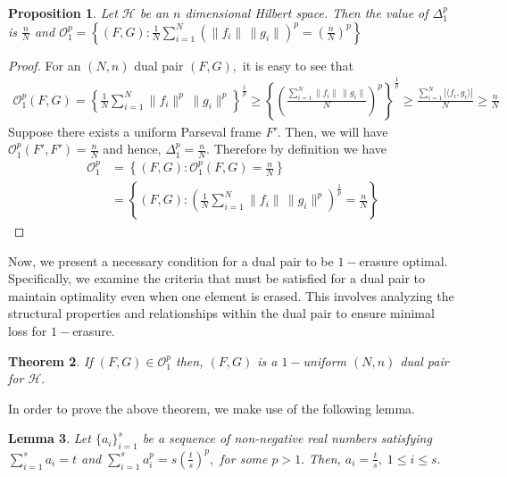 \documentclass[final,1p,times]{elsarticle}
\newtheorem{thm}{Theorem}[section]
\newtheorem{lem}[thm]{Lemma}
\newtheorem{prop}[thm]{Proposition}
\begin{document}
	\begin{prop}\label{prop4point1}
	Let $\mathcal{H}$ be an $n$ dimensional Hilbert space. Then the  value of $ \Delta_{1}^p$ is $\frac{n}{N}$ and  $ \mathcal{O}_{1}^p = \left\{(F,G): \frac{1}{N} \sum\limits_{i=1}^N \left(\|f_i\|\,\| g_i \| \right)^p =  \left(  \frac{n}{N}  \right)^p \right\}$ 
\end{prop}
\begin{proof}
	For an $(N,n) $ dual pair $(F,G),$ it is easy to see that
	\begin{align*}
		\mathcal{O}_{1}^p (F,G) = \left\{\frac{1}{N} \sum \limits_{i=1}^N\|f_i\|^p\,\| g_i \| ^p\right\}^{\frac{1}{p}} \geq \left\{ \left(\frac{\sum\limits_{i=1}^N \|f_i\|\,\| g_i \|}{N}  \right)^p\right\}^{\frac{1}{p}} \geq \frac{\sum\limits_{i=1}^N \left|\langle f_i, g_i \rangle \right|}{N} \geq \frac{n}{N}
	\end{align*}
Suppose there exists a uniform Parseval frame $F'$. Then, we will have  $\mathcal{O}_{1}^p (F',F') = \frac{n}{N} $ and hence, $ \Delta_{1}^p  = \frac{n}{N}.$ Therefore by definition we have 
\begin{align*}
	\mathcal{O}_{1}^p  &= \left\{(F,G): \mathcal{O}_{1}^p (F,G) = \frac{n}{N} \right\} \\& = \left\{(F,G): \left(\frac{1}{N} \sum \limits_{i=1}^N\|f_i\|\,\| g_i \| ^p\right)^{\frac{1}{p}} = \frac{n}{N} \right\} 
\end{align*}
\end{proof}
 Now, we present a necessary condition for a dual pair to be $1-$erasure optimal. Specifically, we examine the criteria that must be satisfied for a dual pair to maintain optimality even when one element is erased. This involves analyzing the structural properties and relationships within the dual pair to ensure minimal loss for $1-$erasure.
 
 \begin{thm}\label{thm4point2}
 	If $(F,G) \in \mathcal{O}_{1}^p $ then, $(F,G)$ is a $1-$uniform $(N,n)$ dual pair for $\mathcal{H}.$ 
 \end{thm}
In order to prove the above theorem, we make use of the following lemma.

\begin{lem}\label{lemma4point3}
	Let $\{a_i\}_{i=1}^s$ be a sequence of non-negative real numbers satisfying $\sum\limits_{i=1}^s a_i= t$ and $\sum\limits_{i=1}^s a^{p}_i= s\left(\frac{t}{s}  \right)^p,$ for some $p>1.$ Then, $a_i = \frac{t}{s},\;1 \leq i \leq s.$
\end{lem}
\end{document}
